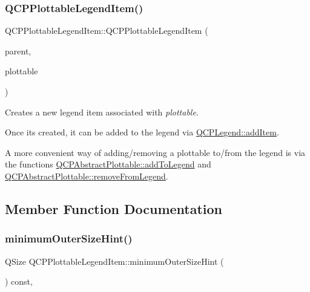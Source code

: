 \subsubsection{\texorpdfstring{Q\+C\+P\+Plottable\+Legend\+Item()}{QCPPlottableLegendItem()}}
{\footnotesize\ttfamily Q\+C\+P\+Plottable\+Legend\+Item\+::\+Q\+C\+P\+Plottable\+Legend\+Item (\begin{DoxyParamCaption}\item[{\hyperlink{classQCPLegend}{Q\+C\+P\+Legend} $\ast$}]{parent,  }\item[{\hyperlink{classQCPAbstractPlottable}{Q\+C\+P\+Abstract\+Plottable} $\ast$}]{plottable }\end{DoxyParamCaption})}

Creates a new legend item associated with {\itshape plottable}.

Once it\textquotesingle{}s created, it can be added to the legend via \hyperlink{classQCPLegend_a3ab274de52d2951faea45a6d975e6b3f}{Q\+C\+P\+Legend\+::add\+Item}.

A more convenient way of adding/removing a plottable to/from the legend is via the functions \hyperlink{classQCPAbstractPlottable_aa64e93cb5b606d8110d2cc0a349bb30f}{Q\+C\+P\+Abstract\+Plottable\+::add\+To\+Legend} and \hyperlink{classQCPAbstractPlottable_a3cc235007e2343a65ad4f463767e0e20}{Q\+C\+P\+Abstract\+Plottable\+::remove\+From\+Legend}. 

\subsection{Member Function Documentation}
\mbox{\label{classQCPPlottableLegendItem_a8b543f3ac32b2fe59326e01c1101b3b8}} 
\subsubsection{\texorpdfstring{minimum\+Outer\+Size\+Hint()}{minimumOuterSizeHint()}}
{\footnotesize\ttfamily Q\+Size Q\+C\+P\+Plottable\+Legend\+Item\+::minimum\+Outer\+Size\+Hint (\begin{DoxyParamCaption}{ }\end{DoxyParamCaption}) const\hspace{0.3cm}{\ttfamily [protected]}, {\ttfamily [virtual]}}

